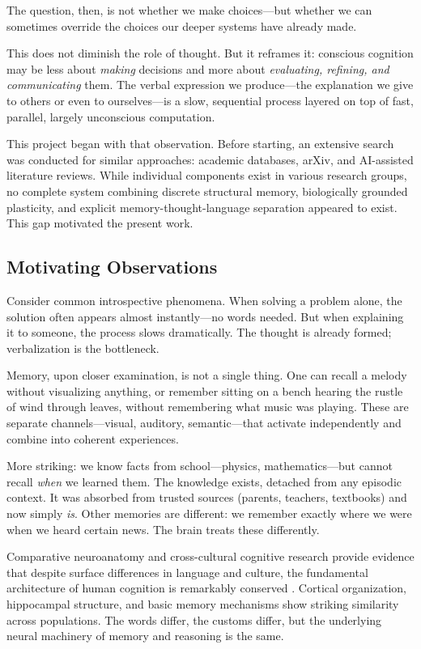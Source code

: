 \documentclass[11pt]{article}
\begin{document}
The question, then, is not whether we make choices---but whether we can sometimes override the choices our deeper systems have already made.

This does not diminish the role of thought. But it reframes it: conscious cognition may be less about \emph{making} decisions and more about \emph{evaluating, refining, and communicating} them. The verbal expression we produce---the explanation we give to others or even to ourselves---is a slow, sequential process layered on top of fast, parallel, largely unconscious computation.

This project began with that observation. Before starting, an extensive search was conducted for similar approaches: academic databases, arXiv, and AI-assisted literature reviews. While individual components exist in various research groups, no complete system combining discrete structural memory, biologically grounded plasticity, and explicit memory-thought-language separation appeared to exist. This gap motivated the present work.

\subsection{Motivating Observations}

Consider common introspective phenomena. When solving a problem alone, the solution often appears almost instantly---no words needed. But when explaining it to someone, the process slows dramatically. The thought is already formed; verbalization is the bottleneck.

Memory, upon closer examination, is not a single thing. One can recall a melody without visualizing anything, or remember sitting on a bench hearing the rustle of wind through leaves, without remembering what music was playing. These are separate channels---visual, auditory, semantic---that activate independently and combine into coherent experiences.

More striking: we know facts from school---physics, mathematics---but cannot recall \emph{when} we learned them. The knowledge exists, detached from any episodic context. It was absorbed from trusted sources (parents, teachers, textbooks) and now simply \emph{is}. Other memories are different: we remember exactly where we were when we heard certain news. The brain treats these differently.

Comparative neuroanatomy and cross-cultural cognitive research provide evidence that despite surface differences in language and culture, the fundamental architecture of human cognition is remarkably conserved \citep{braitenberg1998cortex,dehaene2020we}. Cortical organization, hippocampal structure, and basic memory mechanisms show striking similarity across populations. The words differ, the customs differ, but the underlying neural machinery of memory and reasoning is the same.
\end{document}
